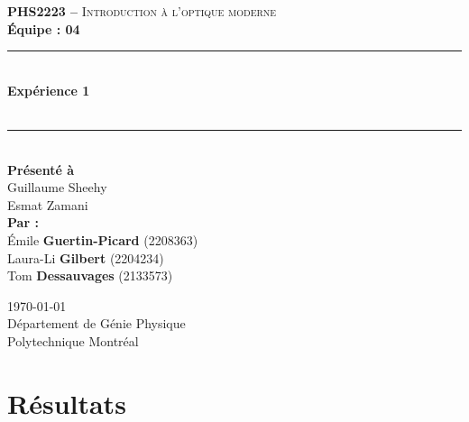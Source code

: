 \documentclass[11pt,letterpaper]{article}
\begin{document}
\begin{titlepage}
\center

\begin{figure}
\end{figure}
\vspace*{2 cm}

\textsc{\Large \textbf{PHS2223 --} Introduction à l'optique moderne}\\[0.5cm]
\large{\textbf{Équipe : 04}}\\[1.5cm]

\rule{\linewidth}{0.5mm} \\[0.5cm]
\Large{\textbf{Expérience 1}} \\[0.2cm]
\\
\rule{\linewidth}{0.2mm} \\[2.3cm]

\large{\textbf{Présenté à}\\
  Guillaume Sheehy\\
  Esmat Zamani\\[2.5cm]
  \textbf{Par :}\\
  Émile \textbf{Guertin-Picard} (2208363)\\
  Laura-Li \textbf{Gilbert} (2204234)\\
  Tom \textbf{Dessauvages} (2133573)\\[3cm]}

\large{\today\\
Département de Génie Physique\\
Polytechnique Montréal\\}

\end{titlepage}


\tableofcontents
{}
\newpage

\pagestyle{fancy}
\setlength{\headheight}{14pt}
\renewcommand{\headrulewidth}{0pt}
\fancyfoot[R]{\thepage}

\pagestyle{fancy}
\fancyhf{}
\renewcommand{\headrulewidth}{1pt}
\fancyfoot[R]{\thepage}

\setcounter{page}{1}


\section{Résultats}
\end{document}
